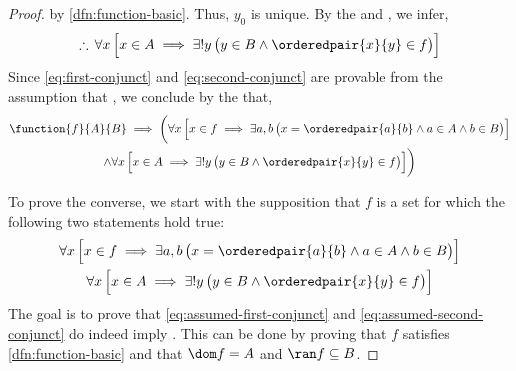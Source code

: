 \begin{proof}
    by \cref{dfn:function-basic}. Thus, \( y_{0} \) is unique.
    By the  and , we infer,
    \begin{equation}
        \label{eq:second-conjunct}
        \therefore \,
        \forall x \, \Big[ x \in A \implies \exists! y \, \big( y \in B \land \orderedpair{x}{y} \in f \big) \Big]
    \end{equation}
    Since \eqref{eq:first-conjunct} and \eqref{eq:second-conjunct} are provable from the assumption that ,
    we conclude by the  that,
    \begin{multline}
        \label{eq:f-A-B-implies-element-of-pairs-and-uniqueness-of-y}
        \function{f}{A}{B}
        \implies
        \bigg( \forall x \, \Big[ x \in f \implies \exists a,b \, \big( x = \orderedpair{a}{b} \land a \in A \land b \in B \big) \Big] \\
        \land
        \forall x \, \Big[ x \in A \implies \exists! y \, \big( y \in B \land \orderedpair{x}{y} \in f \big) \Big]
        \bigg)
    \end{multline}

    \vspace{0.2cm}
    \noindent
    To prove the converse, we start with the supposition that \( f \) is a set for which the following two statements hold true:
    \begin{gather}
        \forall x \, \Big[ x \in f \implies \exists a,b \, \big( x = \orderedpair{a}{b} \land a \in A \land b \in B \big) \Big]
        \label{eq:assumed-first-conjunct} \\
        \forall x \, \Big[ x \in A \implies \exists! y \, \big( y \in B \land \orderedpair{x}{y} \in f \big) \Big]
        \label{eq:assumed-second-conjunct}
    \end{gather}
    The goal is to prove that \eqref{eq:assumed-first-conjunct} and
    \eqref{eq:assumed-second-conjunct} do indeed imply .
    This can be done by proving that \( f \) satisfies \cref{dfn:function-basic}
    and that \( \dom f = A \) and \( \ran f \subseteq B \).


\end{proof}
